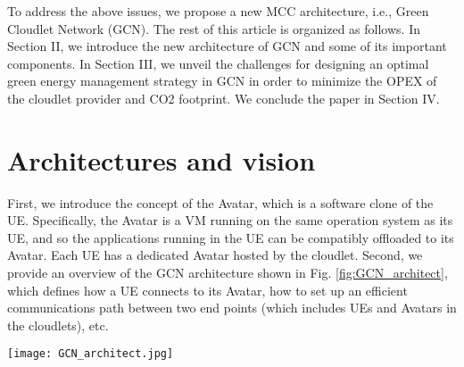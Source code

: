 \documentclass[journal,12pt,draftclsnofoot,onecolumn]{IEEEtran}
\begin{document}
To address the above issues, we propose a new MCC architecture, i.e., Green Cloudlet Network (GCN). The rest of this article is organized as follows. In Section II, we introduce the new architecture of GCN and some of its important components. In Section III, we unveil the challenges for designing an optimal green energy management strategy in GCN in order to minimize the OPEX of the cloudlet provider and CO2 footprint. We conclude the paper in Section IV.

\section{Architectures and vision}
First, we introduce the concept of the Avatar, which is a software clone of the UE. Specifically, the Avatar is a VM running on the same operation system as its UE, and so the applications running in the UE can be compatibly offloaded to its Avatar. Each UE has a dedicated Avatar hosted by the cloudlet. Second, we provide an overview of the GCN architecture shown in Fig. \ref{fig:GCN_architect}, which defines how a UE connects to its Avatar, how to set up an efficient communications path between two end points (which includes UEs and Avatars in the cloudlets), etc.

\begin{figure*}[!h]
\begin{minipage}[t]{1\linewidth}
	\centering	
	\texttt{[image: GCN\_architect.jpg]}
	\caption{Green cloudlet network architecture.}	
	\label{fig:GCN_architect}
\end{minipage}
\end{figure*}
\end{document}
